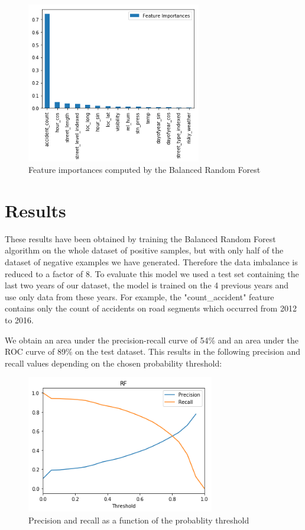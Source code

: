 \documentclass[conference]{IEEEtran}
\begin{document}
\begin{figure}[htbp]
\centerline{\includegraphics[height=7cm, keepaspectratio]{figures/feature_importances.png}}
\caption{Feature importances computed by the Balanced Random Forest}
\label{fig}
\end{figure}

\section{Results}
These results have been obtained by training the Balanced Random Forest algorithm on the whole dataset of positive samples, but with only half of the dataset of negative examples we have generated. Therefore the data imbalance is reduced to a factor of 8. To evaluate this model we used a test set containing the last two years of our dataset, the model is trained on the 4 previous years and use only data from these years. For example, the "count\_accident" feature contains only the count of accidents on road segments which occurred from 2012 to 2016.

We obtain an area under the precision-recall curve of 54\% and an area under the ROC curve of 89\% on the test dataset.
This results in the following precision and recall values depending on the chosen probability threshold:

\begin{figure}[htbp]
\centerline{\includegraphics[height=6cm, keepaspectratio]{figures/pr.png}}
\caption{Precision and recall as a function of the probablity threshold}
\label{fig}
\end{figure}
\end{document}
